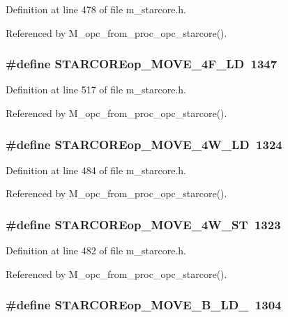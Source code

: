 Definition at line 478 of file m\_\-starcore.h.

Referenced by M\_\-opc\_\-from\_\-proc\_\-opc\_\-starcore().
\subsubsection{\setlength{\rightskip}{0pt plus 5cm}\#define STARCOREop\_\-MOVE\_\-4F\_\-LD~1347}\label{m__starcore_8h_d791bdeca3a690dfe97553cc349e8331}




Definition at line 517 of file m\_\-starcore.h.

Referenced by M\_\-opc\_\-from\_\-proc\_\-opc\_\-starcore().
\subsubsection{\setlength{\rightskip}{0pt plus 5cm}\#define STARCOREop\_\-MOVE\_\-4W\_\-LD~1324}\label{m__starcore_8h_bc5c3da4eb90633182d644938c1dd2de}




Definition at line 484 of file m\_\-starcore.h.

Referenced by M\_\-opc\_\-from\_\-proc\_\-opc\_\-starcore().
\subsubsection{\setlength{\rightskip}{0pt plus 5cm}\#define STARCOREop\_\-MOVE\_\-4W\_\-ST~1323}\label{m__starcore_8h_cebe4a82a4c398139aca3188b1a3d3ca}




Definition at line 482 of file m\_\-starcore.h.

Referenced by M\_\-opc\_\-from\_\-proc\_\-opc\_\-starcore().
\subsubsection{\setlength{\rightskip}{0pt plus 5cm}\#define STARCOREop\_\-MOVE\_\-B\_\-LD\_~1304}\label{m__starcore_8h_9ea1bc27053a0e3ca8a4ad1c7a4adeb1}




